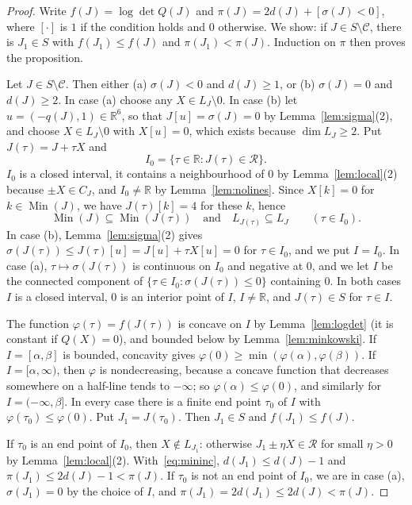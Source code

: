 \documentclass[11pt]{amsart}
\theoremstyle{definition}
\theoremstyle{remark}
\numberwithin{equation}{section}
\numberwithin{table}{section}
\numberwithin{figure}{section}
\newcommand{\R}{\mathbb{R}}
\newcommand{\Rk}{\mathcal{R}}
\newcommand{\Min}{\operatorname{Min}}
\newcommand{\cand}{\mathcal{C}}
\begin{document}
\begin{proof}
Write $f(J)=\log\det Q(J)$ and $\pi(J)=2d(J)+[\sigma(J)<0]$, where $[\cdot]$ is $1$ if the condition holds and $0$ otherwise. We show: if $J\in S\setminus\cand$, there is $J_1\in S$ with $f(J_1)\le f(J)$ and $\pi(J_1)<\pi(J)$. Induction on $\pi$ then proves the proposition.

Let $J\in S\setminus\cand$. Then either (a) $\sigma(J)<0$ and $d(J)\ge1$, or (b) $\sigma(J)=0$ and $d(J)\ge2$. In case (a) choose any $X\in L_J\setminus0$. In case (b) let $u=(-q(J),1)\in\R^6$, so that $J[u]=\sigma(J)=0$ by Lemma~\ref{lem:sigma}(2), and choose $X\in L_J\setminus0$ with $X[u]=0$, which exists because $\dim L_J\ge2$. Put $J(\tau)=J+\tau X$ and
\[
I_0=\{\tau\in\R:J(\tau)\in\Rk\}.
\]
$I_0$ is a closed interval, it contains a neighbourhood of $0$ by Lemma~\ref{lem:local}(2) because $\pm X\in C_J$, and $I_0\ne\R$ by Lemma~\ref{lem:nolines}. Since $X[k]=0$ for $k\in\Min(J)$, we have $J(\tau)[k]=4$ for these $k$, hence
\begin{equation}\label{eq:mininc}
\Min(J)\subseteq\Min(J(\tau))\quad\text{and}\quad L_{J(\tau)}\subseteq L_J\qquad(\tau\in I_0).
\end{equation}
In case (b), Lemma~\ref{lem:sigma}(2) gives $\sigma(J(\tau))\le J(\tau)[u]=J[u]+\tau X[u]=0$ for $\tau\in I_0$, and we put $I=I_0$. In case (a), $\tau\mapsto\sigma(J(\tau))$ is continuous on $I_0$ and negative at $0$, and we let $I$ be the connected component of $\{\tau\in I_0:\sigma(J(\tau))\le0\}$ containing $0$. In both cases $I$ is a closed interval, $0$ is an interior point of $I$, $I\ne\R$, and $J(\tau)\in S$ for $\tau\in I$.

The function $\varphi(\tau)=f(J(\tau))$ is concave on $I$ by Lemma~\ref{lem:logdet} (it is constant if $Q(X)=0$), and bounded below by Lemma~\ref{lem:minkowski}. If $I=[\alpha,\beta]$ is bounded, concavity gives $\varphi(0)\ge\min(\varphi(\alpha),\varphi(\beta))$. If $I=[\alpha,\infty)$, then $\varphi$ is nondecreasing, because a concave function that decreases somewhere on a half-line tends to $-\infty$; so $\varphi(\alpha)\le\varphi(0)$, and similarly for $I=(-\infty,\beta]$. In every case there is a finite end point $\tau_0$ of $I$ with $\varphi(\tau_0)\le\varphi(0)$. Put $J_1=J(\tau_0)$. Then $J_1\in S$ and $f(J_1)\le f(J)$.

If $\tau_0$ is an end point of $I_0$, then $X\notin L_{J_1}$: otherwise $J_1\pm\eta X\in\Rk$ for small $\eta>0$ by Lemma~\ref{lem:local}(2). With~\eqref{eq:mininc}, $d(J_1)\le d(J)-1$ and $\pi(J_1)\le2d(J)-1<\pi(J)$. If $\tau_0$ is not an end point of $I_0$, we are in case (a), $\sigma(J_1)=0$ by the choice of $I$, and $\pi(J_1)=2d(J_1)\le2d(J)<\pi(J)$.
\end{proof}
\end{document}

